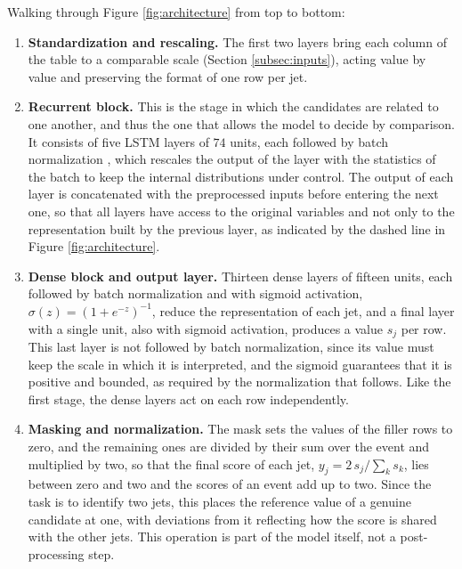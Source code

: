 Walking through Figure \ref{fig:architecture} from top to bottom:
\begin{enumerate}
    \item \textbf{Standardization and rescaling.} The first two layers bring each column of the table to a comparable scale (Section \ref{subsec:inputs}), acting value by value and preserving the format of one row per jet.
    \item \textbf{Recurrent block.} This is the stage in which the candidates are related to one another, and thus the one that allows the model to decide by comparison. It consists of five LSTM layers of $74$ units, each followed by batch normalization \cite{Ioffe2015}, which rescales the output of the layer with the statistics of the batch to keep the internal distributions under control. The output of each layer is concatenated with the preprocessed inputs before entering the next one, so that all layers have access to the original variables and not only to the representation built by the previous layer, as indicated by the dashed line in Figure \ref{fig:architecture}.
    \item \textbf{Dense block and output layer.} Thirteen dense layers of fifteen units, each followed by batch normalization and with sigmoid activation, $\sigma(z) = (1+e^{-z})^{-1}$, reduce the representation of each jet, and a final layer with a single unit, also with sigmoid activation, produces a value $s_j$ per row. This last layer is not followed by batch normalization, since its value must keep the scale in which it is interpreted, and the sigmoid guarantees that it is positive and bounded, as required by the normalization that follows. Like the first stage, the dense layers act on each row independently.
    \item \textbf{Masking and normalization.} The mask sets the values of the filler rows to zero, and the remaining ones are divided by their sum over the event and multiplied by two, so that the final score of each jet, $y_j = 2\,s_j / \sum_k s_k$, lies between zero and two and the scores of an event add up to two. Since the task is to identify two jets, this places the reference value of a genuine candidate at one, with deviations from it reflecting how the score is shared with the other jets. This operation is part of the model itself, not a post-processing step.
\end{enumerate}





